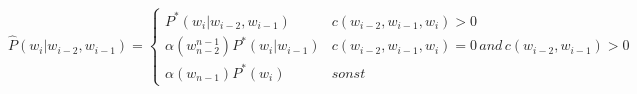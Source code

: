 \begin{equation}
\label{equation:backing_off_03}
\hat{P}(w_{i}|w_{i-2},w_{i-1})=
	\begin{cases}
		P^{*}(w_{i}|w_{i-2},w_{i-1}) & c(w_{i-2},w_{i-1},w_{i})>0\\
		\alpha(w_{n-2}^{n-1})P^{*}(w_{i}|w_{i-1}) & c(w_{i-2},w_{i-1},w_{i})=0 \, and\, c(w_{i-2},w_{i-1})>0\\
		\alpha(w_{n-1})P^{*}(w_{i}) & sonst
	\end{cases}
\end{equation}